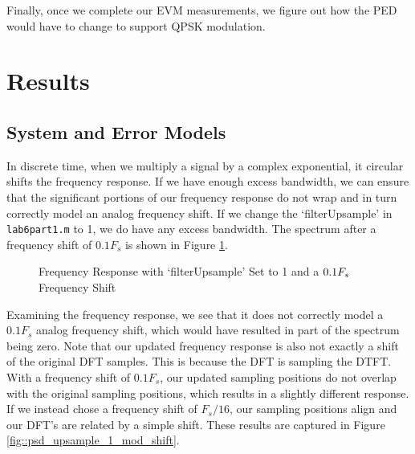 \documentclass{article}
\begin{document}
\noindent Finally, once we complete our EVM measurements, we figure out how the PED would have to change to support QPSK modulation.

\section{Results}

\subsection{System and Error Models}

In discrete time, when we multiply a signal by a complex exponential, it circular shifts the frequency response. If we have enough excess bandwidth, we can ensure that the significant portions of our frequency response do not wrap and in turn correctly model an analog frequency shift. If we change the `filterUpsample' in \texttt{lab6part1.m} to 1, we do have any excess bandwidth. The spectrum after a frequency shift of $0.1F_s$ is shown in Figure \ref{fig::psd_upsample_1}.

\begin{figure}[H]
	\centerline{}
	\caption{Frequency Response with `filterUpsample' Set to 1 and a $\protect{0.1F_s}$ Frequency Shift}
	\label{fig::psd_upsample_1}
\end{figure}

\noindent Examining the frequency response, we see that it does not correctly model a $0.1F_s$ analog frequency shift, which would have resulted in part of the spectrum being zero. Note that our updated frequency response is also not exactly a shift of the original DFT samples. This is because the DFT is sampling the DTFT. With a frequency shift of $0.1F_s$, our updated sampling positions do not overlap with the original sampling positions, which results in a slightly different response. If we instead chose a frequency shift of $F_s/16$, our sampling positions align and our DFT's are related by a simple shift. These results are captured in Figure \ref{fig::psd_upsample_1_mod_shift}.
\end{document}
